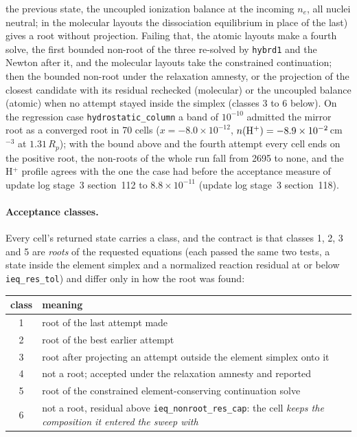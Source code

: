 the previous state, the uncoupled ionization balance at the incoming $n_e$,
all nuclei neutral; in the molecular layouts the dissociation equilibrium
in place of the last) gives a root without projection. Failing that, the
atomic layouts make a fourth solve, the first bounded non-root of the three
re-solved by \texttt{hybrd1} and the Newton after it, and the molecular layouts take the
constrained continuation; then the bounded non-root under the relaxation
amnesty, or the projection of the closest candidate with its residual
rechecked (molecular) or the uncoupled balance (atomic) when no attempt
stayed inside the simplex (classes 3 to 6 below). On the regression case
\texttt{hydrostatic\_column} a band of $10^{-10}$ admitted the mirror root as
a converged root in 70 cells ($x=-8.0\times10^{-12}$, $n({\rm
H^+})=-8.9\times10^{-2}$\,cm$^{-3}$ at $1.31\,R_p$); with the bound above
and the fourth attempt every cell ends on the positive root, the non-roots of
the whole run fall from 2695 to none, and the H$^+$ profile agrees with the
one the case had before the acceptance measure of update log stage~3
section~112 to $8.8\times10^{-11}$ (update log stage~3 section~118).

\paragraph{Acceptance classes.} Every cell's returned state carries a class,
and the contract is that classes 1, 2, 3 and 5 are \emph{roots} of the
requested equations (each passed the same two tests, a state inside the
element simplex and a normalized reaction residual at or below
\texttt{ieq\_res\_tol}) and differ only in how the root was found:

\begin{center}
\begin{tabular}{cl}
\toprule
class & meaning\\
\midrule
1 & root of the last attempt made\\
2 & root of the best earlier attempt\\
3 & root after projecting an attempt outside the element simplex onto it\\
4 & not a root; accepted under the relaxation amnesty and reported\\
5 & root of the constrained element-conserving continuation solve\\
6 & not a root, residual above \texttt{ieq\_nonroot\_res\_cap}: the cell
    \emph{keeps the composition it entered the sweep with}\\
\bottomrule
\end{tabular}
\end{center}

